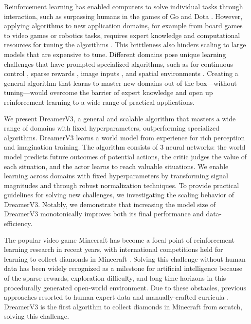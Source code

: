 Reinforcement learning has enabled computers to solve individual tasks through interaction, such as surpassing humans in the games of Go and Dota \citep{silver2016alphago,openai2018dota}.
However, applying algorithms to new application domains, for example from board games to video games or robotics tasks, requires expert knowledge and computational resources for tuning the algorithms \citep{andrychowicz2020whatmatters}.
This brittleness also hinders scaling to large models that are expensive to tune.
Different domains pose unique learning challenges that have prompted specialized algorithms, such as for continuous control \citep{lillicrap2015ddpg,gu2016naf}, sparse rewards \citep{jaderberg2016unreal,riedmiller2018sparseplay}, image inputs \citep{anand2019ataristaterep,laskin2020rad}, and spatial environments \citep{mirchev2020argmax3d,driess2022nerfrl}.
Creating a general algorithm that learns to master new domains out of the box---without tuning---would overcome the barrier of expert knowledge and open up reinforcement learning to a wide range of practical applications.

We present DreamerV3, a general and scalable algorithm that masters a wide range of domains with fixed hyperparameters, outperforming specialized algorithms.
DreamerV3 learns a world model \citep{sutton1991dyna,ha2018worldmodels,hafner2018planet} from experience for rich perception and imagination training.
The algorithm consists of 3 neural networks: the world model predicts future outcomes of potential actions, the critic judges the value of each situation, and the actor learns to reach valuable situations.
We enable learning across domains with fixed hyperparameters by transforming signal magnitudes and through robust normalization techniques.
To provide practical guidelines for solving new challenges, we investigating the scaling behavior of DreamerV3.
Notably, we demonstrate that increasing the model size of DreamerV3 monotonically improves both its final performance and data-efficiency.

The popular video game Minecraft has become a focal point of reinforcement learning research in recent years, with international competitions held for learning to collect diamonds in Minecraft \citep{guss2019minerl}.
Solving this challenge without human data has been widely recognized as a milestone for artificial intelligence because of the sparse rewards, exploration difficulty, and long time horizons in this procedurally generated open-world environment.
Due to these obstacles, previous approaches resorted to human expert data and manually-crafted curricula \citep{baker2022vpt,kanitscheider2021minecraftcurriculum}.
DreamerV3 is the first algorithm to collect diamonds in Minecraft from scratch, solving this challenge.


